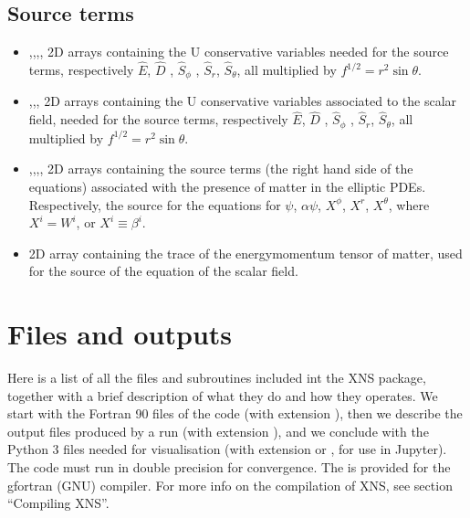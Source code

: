 \documentclass[letterpaper,10pt,english]{sphinxmanual}
\begin{document}
\section{Source terms}
\label{\detokenize{arrays:source-terms}}\begin{itemize}
\item {} 
\sphinxAtStartPar
{},,,, \sphinxhyphen{} 2D arrays containing the U conservative variables needed for
the source terms, respectively \(\hat E\), \(\hat D\) , \(\hat S _\phi\) , \(\hat S _r\), \(\hat S _\theta\), all multiplied by \(f ^{1/2} = r^2 \sin \theta\).


\item {} 
\sphinxAtStartPar
{},,, \sphinxhyphen{} 2D arrays containing the U conservative variables associated to the scalar field, needed for the source terms, respectively \(\hat E\), \(\hat D\) , \(\hat S _\phi\) , \(\hat S _r\), \(\hat S _\theta\), all multiplied by \(f ^{1/2} = r^2 \sin \theta\).


\item {} 
\sphinxAtStartPar
{},,,, \sphinxhyphen{} 2D arrays containing the source terms (the right hand side of
the equations) associated with the presence of matter in the elliptic PDEs. Respectively, the source
for the equations for \(\psi\), \(\alpha \psi\), \(X^{\phi}\), \(X^{r}\), \(X^{\theta}\), where \(X^i=W^i\), or \(X^i ≡ \beta ^i\).


\item {} 
\sphinxAtStartPar
{} \sphinxhyphen{} 2D array containing the trace of the energy\sphinxhyphen{}momentum tensor of matter, used for the source of the equation of the scalar field.

\end{itemize}


\chapter{Files and outputs}
\label{\detokenize{files_outputs:files-and-outputs}}\label{\detokenize{files_outputs::doc}}
\sphinxAtStartPar
Here is a list of all the files and subroutines included int the XNS package, together with a brief
description of what they do and how they operates. We start with the Fortran 90 files of the code (with
extension ), then we describe the output files produced by a run (with extension ), and we conclude
with the Python 3 files needed for visualisation (with extension  or , for use in Jupyter). The code
must run in double precision for convergence. The  is provided for the gfortran (GNU) compiler. For more
info on the compilation of XNS, see section “Compiling XNS”.
\end{document}
